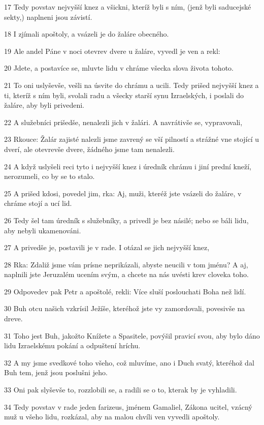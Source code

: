 \par 17 Tedy povstav nejvyšší knez a všickni, kteríž byli s ním, (jenž byli saducejské sekty,) naplneni jsou závistí.
\par 18 I zjímali apoštoly, a vsázeli je do žaláre obecného.
\par 19 Ale andel Páne v noci otevrev dvere u žaláre, vyvedl je ven a rekl:
\par 20 Jdete, a postavíce se, mluvte lidu v chráme všecka slova života tohoto.
\par 21 To oni uslyševše, vešli na úsvite do chrámu a ucili. Tedy prišed nejvyšší knez a ti, kteríž s ním byli, svolali radu a všecky starší synu Izraelských, i poslali do žaláre, aby byli privedeni.
\par 22 A služebníci prišedše, nenalezli jich v žalári. A navrátivše se, vypravovali,
\par 23 Rkouce: Žalár zajisté nalezli jsme zavrený se vší pilností a strážné vne stojící u dverí, ale otevrevše dvere, žádného jsme tam nenalezli.
\par 24 A když uslyšeli reci tyto i nejvyšší knez i úredník chrámu i jiní prední kneží, nerozumeli, co by se to stalo.
\par 25 A prišed kdosi, povedel jim, rka: Aj, muži, kteréž jste vsázeli do žaláre, v chráme stojí a ucí lid.
\par 26 Tedy šel tam úredník s služebníky, a privedl je bez násilé; nebo se báli lidu, aby nebyli ukamenováni.
\par 27 A privedše je, postavili je v rade. I otázal se jich nejvyšší knez,
\par 28 Rka: Zdaliž jsme vám prísne neprikázali, abyste neucili v tom jménu? A aj, naplnili jste Jeruzalém ucením svým, a chcete na nás uvésti krev cloveka toho.
\par 29 Odpovedev pak Petr a apoštolé, rekli: Více sluší poslouchati Boha než lidí.
\par 30 Buh otcu našich vzkrísil Ježíše, kteréhož jste vy zamordovali, povesivše na dreve.
\par 31 Toho jest Buh, jakožto Knížete a Spasitele, povýšil pravicí svou, aby bylo dáno lidu Izraelskému pokání a odpuštení hríchu.
\par 32 A my jsme svedkové toho všeho, což mluvíme, ano i Duch svatý, kteréhož dal Buh tem, jenž jsou poslušni jeho.
\par 33 Oni pak slyševše to, rozzlobili se, a radili se o to, kterak by je vyhladili.
\par 34 Tedy povstav v rade jeden farizeus, jménem Gamaliel, Zákona ucitel, vzácný muž u všeho lidu, rozkázal, aby na malou chvíli ven vyvedli apoštoly.
